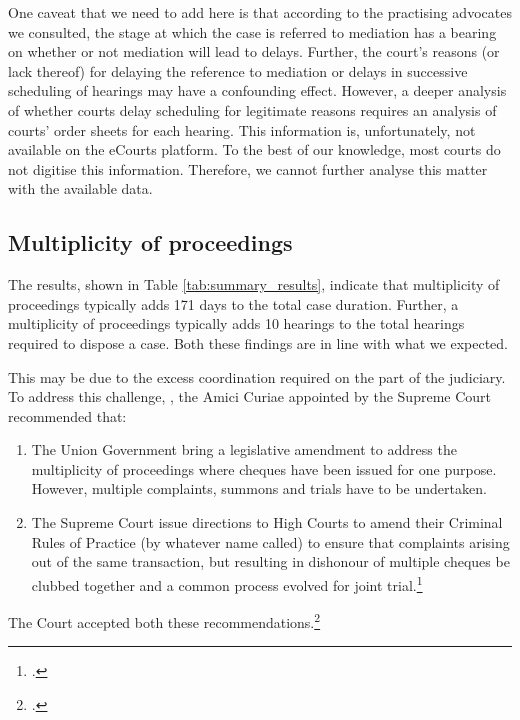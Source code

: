 One caveat that we need to add here is that according to the practising advocates we consulted, the stage at which the case is referred to mediation has a bearing on whether or not mediation will lead to delays. Further, the court's reasons (or lack thereof) for delaying the reference to mediation or delays in successive scheduling of hearings may have a confounding effect. However, a deeper analysis of whether courts delay scheduling for legitimate reasons requires an analysis of courts' order sheets for each hearing. This information is, unfortunately, not available on the eCourts platform. To the best of our knowledge, most courts do not digitise this information. Therefore, we cannot further analyse this matter with the available data.

\subsection{Multiplicity of proceedings}
\label{sec:mult-proc}

The results, shown in Table \ref{tab:summary_results}, indicate that multiplicity of proceedings typically adds 171 days to the total case duration. Further, a multiplicity of proceedings typically adds 10 hearings to the total hearings required to dispose a case. Both these findings are in line with what we expected.

This may be due to the excess coordination required on the part of the judiciary. To address this challenge, , the Amici Curiae appointed by the Supreme Court recommended that:

\begin{enumerate}
 \item The Union Government bring a legislative amendment to address the multiplicity of proceedings where cheques have been issued for one purpose. However, multiple complaints, summons and trials have to be undertaken. 
 \item The Supreme Court issue directions to High Courts to amend their Criminal Rules of Practice (by whatever name called) to ensure that complaints arising out of the same transaction, but resulting in dishonour of multiple cheques be clubbed together and a common process evolved for joint trial.\footcite{amicus2020_submission}
\end{enumerate}

The Court accepted both these recommendations.\footcite{sc2020_138}

